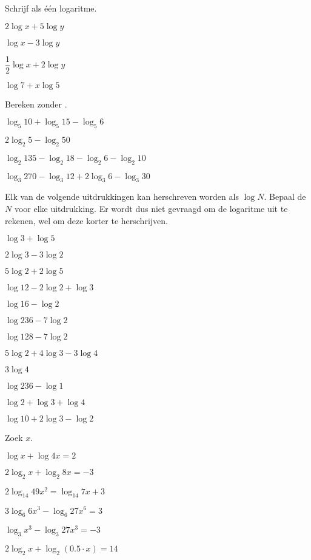 \documentclass[12pt,twoside,a4paper]{article}
\begin{document}
\begin{oefening} %
Schrijf als één logaritme.
\begin{exlist}{2}
  \item $2\log x + 5 \log y$
  \item $\log x - 3 \log y$
  \item $\dfrac{1}{2}\log x + 2 \log y$
  \item $\log 7 + x \log 5$
\end{exlist}
\end{oefening}

\begin{oefening} %
Bereken zonder .
\begin{exlist}{2}
  \item $\log_5 10 + \log_5 15 - \log_5 6$
  \item $2\log_2 5 - \log_2 50$
  \item $\log_2 135 - \log_2 18 - \log_2 6 - \log_2 10$
  \item $\log_3 270 - \log_3 12 + 2\log_3 6 - \log_3 30$
\end{exlist}
\end{oefening}

\begin{oefening} %
Elk van de volgende uitdrukkingen kan herschreven worden als $\log N$. Bepaal de $N$ voor elke uitdrukking. Er wordt dus niet gevraagd om de logaritme uit te rekenen, wel om deze korter te herschrijven.
\begin{exlist}{2}
  \item $\log 3 + \log 5$
  \item $2\log 3 - 3\log 2$
  \item $5\log 2 + 2\log 5$
  \item $\log 12 - 2\log 2 + \log 3$
  \item $\log 16 - \log 2$
  \item $\log 236 - 7\log 2$
  \item $\log 128 - 7\log 2$
  \item $5\log 2 + 4\log 3 - 3\log 4$
  \item $3\log 4$
  \item $\log 236 - \log 1$
  \item $\log 2 + \log 3 + \log 4$
  \item $\log 10 + 2\log 3 - \log 2$
\end{exlist}
\end{oefening}

\begin{oefening}
Zoek $x$.
\begin{exlist}{2}
  \item $\log x + \log 4x = 2$         %
  \item $2\log_2 x + \log_2 8x = -3$   %
  \item $2\log_{14} 49x^2 = \log_{14} 7x + 3$
  \item $3\log_{6} 6x^3 - \log_{6} 27x^6 = 3$
  \item $\log_{3} x^3 - \log_{3} 27x^3 = -3$
  \item $2\log_2 x + \log_2 (0.5 \cdot x) = 14$
\end{exlist}
\end{oefening}
\end{document}
